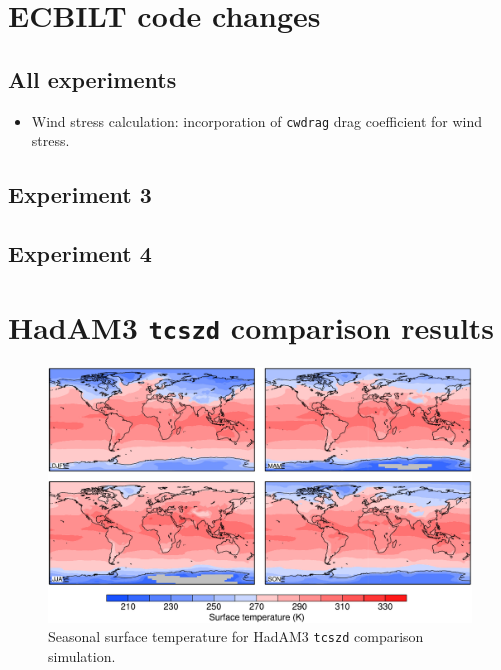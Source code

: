 \documentclass[a4paper,11pt]{article}
\begin{document}
\appendix
\section{ECBILT code changes}

\subsection*{All experiments}

\begin{itemize}
  \item{Wind stress calculation: incorporation of \texttt{cwdrag} drag
    coefficient for wind stress.}
\end{itemize}

\subsection*{Experiment 3}


\subsection*{Experiment 4}


\section{HadAM3 \texttt{tcszd} comparison results}
\label{sec:hadam3}

\begin{figure}
  \begin{center}
    \includegraphics[width=\textwidth]{../hadam3-comparison/plots/ts-plots}
  \end{center}
  \caption{Seasonal surface temperature for HadAM3 \texttt{tcszd}
    comparison simulation.}
  \label{fig:ts-hadam3}
\end{figure}
\end{document}
